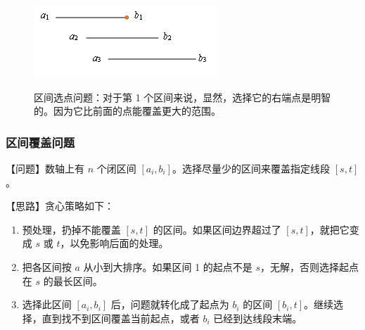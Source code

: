 	\begin{figure}[htb]
		\centering
		\includegraphics{ch1/figures/区间选点问题.png}
		\label{fig:ch1_tx_qjsdwt_2}
		\caption{区间选点问题：对于第 1 个区间来说，显然，选择它的右端点是明智的。因为它比前面的点能覆盖更大的范围。}
	\end{figure}

\subsubsection{区间覆盖问题}
	【问题】数轴上有 $n$ 个闭区间 $[a_i, b_i]$。选择尽量少的区间来覆盖指定线段 $[s, t]$。

	【思路】贪心策略如下：
	
	\begin{enumerate}
		\item 预处理，扔掉不能覆盖 $[s, t]$ 的区间。如果区间边界超过了 $[s, t]$，就把它变成 $s$ 或 $t$，以免影响后面的处理。
		\item 把各区间按 $a$ 从小到大排序。如果区间 1 的起点不是 $s$，无解，否则选择起点在 $s$ 的最长区间。
		\item 选择此区间 $[a_i, b_i]$ 后，问题就转化成了起点为 $b_i$ 的区间 $[b_i, t]$。继续选择，直到找不到区间覆盖当前起点，或者 $b_i$ 已经到达线段末端。
	\end{enumerate}
	
	
	